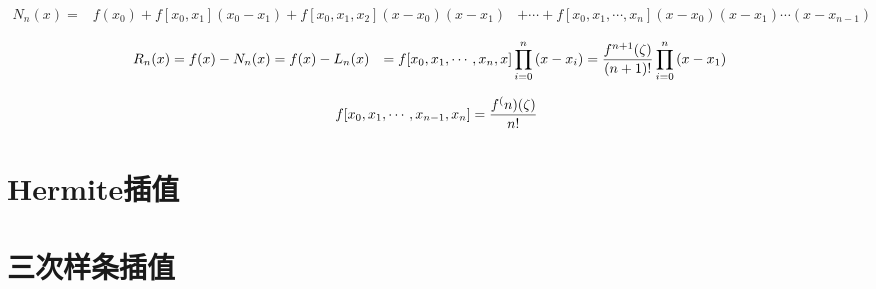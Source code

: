 \begin{equation}
    \begin{aligned}
        N_n(x) =& f(x_0) + f[x_0, x_1](x_0 - x_1) + f[x_0, x_1, x_2](x-x_0)(x-x_1)
                &+\cdots+f[x_0,x_1,\cdots,x_n](x-x_0)(x-x_1)\cdots(x-x_{n-1})
    \end{aligned}
\end{equation}

\begin{equation}
    \begin{aligned}
        R_n(x) &= f(x) - N_n(x) = f(x) - L_n(x) 
               &= f[x_0,x_1,\cdots,x_{n},x]\prod\limits_{i=0}^n\,(x - x_i)
               &= {f^{n+1}(\zeta)\over{(n+1)!}}\prod\limits_{i=0}^n\,(x - x_1)
    \end{aligned}
\end{equation}

\begin{equation}
    f[x_0, x_1, \cdots, x_{n-1}, x_n] = {f^(n)(\zeta)\over{n!}}
\end{equation}


\section{Hermite插值}

\section{三次样条插值}

